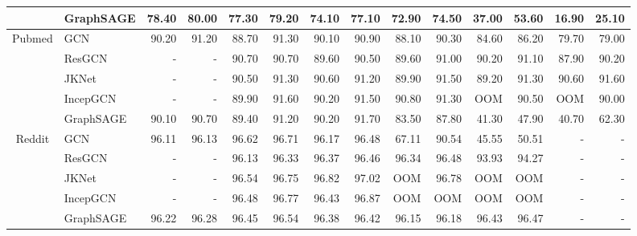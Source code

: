 \documentclass{article}
\begin{document}
\begin{landscape}
\begin{table}[htbp]
\begin{tabular}{cl|rr|rr|rr|rr|rr|rr}
          & GraphSAGE & 78.40 & 80.00 & 77.30 & 79.20 & 74.10 & 77.10 & 72.90 & 74.50 & 37.00 & 53.60 & 16.90 & 25.10 \\
    \hline
    \multirow{5}[2]{*}{Pubmed} & GCN   & 90.20 & 91.20 & 88.70 & 91.30 & 90.10 & 90.90 & 88.10 & 90.30 & 84.60 & 86.20 & 79.70 & 79.00 \\
          & ResGCN & -     & -     & 90.70 & 90.70 & 89.60 & 90.50 & 89.60 & 91.00 & 90.20 & 91.10 & 87.90 & 90.20 \\
          & JKNet & -     & -     & 90.50 & 91.30 & 90.60 & 91.20 & 89.90 & 91.50 & 89.20 & 91.30 & 90.60 & 91.60 \\
          & IncepGCN & -     & -     & 89.90 & 91.60 & 90.20 & 91.50 & 90.80 & 91.30 & OOM   & 90.50 & OOM   & 90.00 \\
          & GraphSAGE & 90.10 & 90.70 & 89.40 & 91.20 & 90.20 & 91.70 & 83.50 & 87.80 & 41.30 & 47.90 & 40.70 & 62.30 \\
    \hline
    \multirow{5}[2]{*}{Reddit} & GCN   & 96.11 & 96.13 & 96.62 & 96.71 & 96.17 & 96.48 & 67.11 & 90.54 & 45.55 & 50.51 & -   & - \\
          & ResGCN & -     & -     & 96.13 & 96.33 & 96.37 & 96.46 & 96.34 & 96.48 & 93.93 & 94.27 & -   & - \\
          & JKNet & -     & -     & 96.54 & 96.75 & 96.82 & 97.02 & OOM   & 96.78 & OOM   & OOM   & -  & - \\
          & IncepGCN & -     & -     & 96.48 & 96.77 & 96.43 & 96.87 & OOM   & OOM   & OOM   & OOM   & -  & - \\
          & GraphSAGE & 96.22 & 96.28 & 96.45 & 96.54 & 96.38 & 96.42 & 96.15 & 96.18 & 96.43 & 96.47 & - & - \\
    \hline
    \end{tabular}\label{tab:dropvsnodrop}\end{table}\vspace*{\fill}
\end{landscape}
\end{document}
